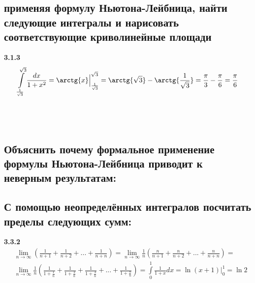 \documentclass[a4paper, 12pt]{article}
\begin{document}
    \subsection{применяя формулу Ньютона-Лейбница, найти следующие интегралы и нарисовать соответствующие криволинейные площади}
    
    \textbf{3.1.3}
    \begin{align*}
    \int\limits_{\frac{1}{\sqrt{3}}}^{\sqrt{3}}\frac{dx}{1+x^2} = 
    \arctg{x}\Big|_{\frac{1}{\sqrt{3}}}^{\sqrt{3}} = 
    \arctg{\sqrt{3}}-\arctg{\frac{1}{\sqrt{3}}} = 
    \frac{\pi}{3}-\frac{\pi}{6} = \frac{\pi}{6}
    \end{align*} \\ [15pt]
     \\

    
    \subsection{Объяснить почему формальное применение формулы Ньютона-Лейбница приводит к неверным результатам:}
    
    \subsection{С помощью неопределённых интегралов посчитать пределы следующих сумм:}
    
    \textbf{3.3.2}
    \begin{align*}
    &\lim\limits_{n \to \infty}\left(\frac{1}{n+1}+\frac{1}{n+2}+\text{...}+\frac{1}{n+n}\right) = 
    \lim\limits_{n \to \infty}\frac{1}{n}\left(\frac{n}{n+1}+\frac{n}{n+2}+\text{...}+\frac{n}{n+n}\right) = \\
    &\lim\limits_{n \to \infty}\frac{1}{n}\left(\frac{1}{1+\frac{1}{n}}+\frac{1}{1+\frac{2}{n}}+\frac{1}{1+\frac{3}{n}}+\text{...}+\frac{1}{1+\frac{n}{n}}\right) = 
    \int\limits_0^1\frac{1}{1+x}dx = \ln{(x+1)} \Big|_0^1 = \ln2
    \end{align*}
    
\end{document}
